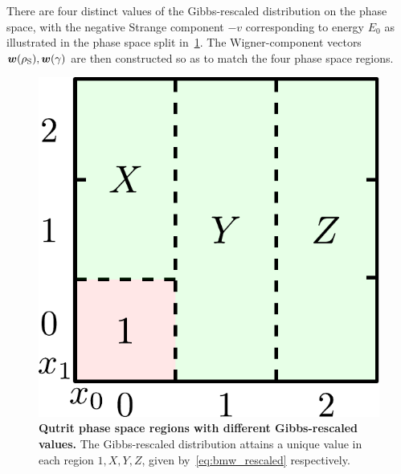 \documentclass[pra,
aps,
twocolumn,
superscriptaddress,
groupedaddress,
nofootinbib,
reprint
]{revtex4-1}
\begin{document}
There are four distinct values of the Gibbs-rescaled distribution on the phase space, with the negative Strange component $-v$ corresponding to energy $E_0$ as illustrated in the phase space split in~\cref{fig:pd_split_thermal}.
The Wigner-component vectors $\bm{w}(\rho_{\rm{S}}), \bm{w}(\gamma)$ are then constructed so as to match the four phase space regions.
\begin{figure}[h]
    \centering
    \includegraphics[scale=0.5]{figs/pd_split_thermal.pdf}
    \caption{\textbf{Qutrit phase space regions with different Gibbs-rescaled values.}
    The Gibbs-rescaled distribution attains a unique value in each region $1,X,Y,Z$, given by~\cref{eq:bmw_rescaled} respectively.
    }
    \label{fig:pd_split_thermal}
\end{figure}
\end{document}
